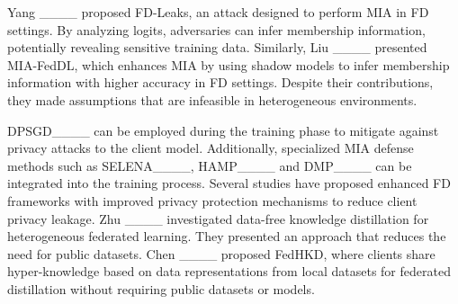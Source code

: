 Yang \etal____ proposed FD-Leaks, an attack designed to perform MIA in FD settings.
By analyzing logits, adversaries can infer membership information, potentially revealing sensitive training data.
Similarly, Liu \etal____ presented MIA-FedDL, which enhances MIA by using shadow models to infer membership information with higher accuracy in FD settings.
Despite their contributions, they made assumptions that are infeasible in heterogeneous environments.
\fi

DPSGD____ can be employed during the training phase to mitigate against privacy attacks to the client model. 
Additionally, specialized MIA defense methods such as SELENA____, HAMP____ and DMP____ can be integrated into the training process.
Several studies have proposed enhanced FD frameworks with improved privacy protection mechanisms to reduce client privacy leakage.
Zhu \etal____ investigated data-free knowledge distillation for heterogeneous federated learning.
They presented an approach that reduces the need for public datasets.
Chen \etal____ proposed FedHKD, where clients share hyper-knowledge based on data representations from local datasets for federated distillation without requiring public datasets or models.

